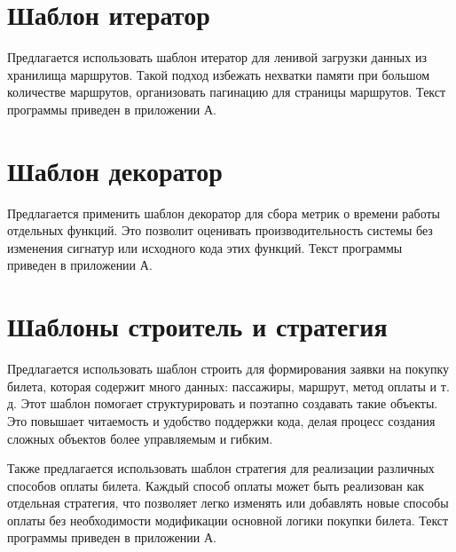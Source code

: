 \section{Шаблон итератор}
Предлагается использовать шаблон итератор для ленивой загрузки данных из
хранилища маршрутов. Такой подход избежать нехватки памяти при большом
количестве маршрутов, организовать пагинацию для страницы маршрутов. Текст
программы приведен в приложении А.

\section{Шаблон декоратор}
Предлагается применить шаблон декоратор для сбора метрик о времени работы
отдельных функций. Это позволит оценивать производительность системы без
изменения сигнатур или исходного кода этих функций. Текст программы приведен в
приложении А.

\section{Шаблоны строитель и стратегия}
Предлагается использовать шаблон строить для формирования заявки на покупку
билета, которая содержит много данных: пассажиры, маршрут, метод оплаты и т. д.
Этот шаблон помогает структурировать и поэтапно создавать такие объекты. Это
повышает читаемость и удобство поддержки кода, делая процесс создания сложных
объектов более управляемым и гибким.

Также предлагается использовать шаблон стратегия для реализации различных
способов оплаты билета. Каждый способ оплаты может быть реализован как отдельная
стратегия, что позволяет легко изменять или добавлять новые способы оплаты без
необходимости модификации основной логики покупки билета. Текст программы
приведен в приложении А.
